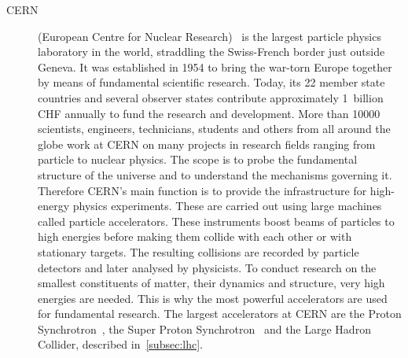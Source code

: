 \begin{description}
\item[CERN] (European Centre for Nuclear Research)~\cite{CERN:00000} is the largest particle physics laboratory in the world, straddling the Swiss-French border just outside Geneva. It was established in 1954 to bring the war-torn Europe together by means of fundamental scientific research. Today, its 22 member state countries and several observer states contribute approximately 1~billion CHF annually to fund the research and development. More than 10000 scientists, engineers, technicians, students and others from all around the globe work at CERN on many projects in research fields ranging from particle to nuclear physics. The scope is to probe the fundamental structure of the universe and to understand the mechanisms governing it. Therefore CERN's main function is to provide the infrastructure for high-energy physics experiments. These are carried out using large machines called particle accelerators. These instruments boost beams of particles to high energies before making them collide with each other or with stationary targets. The resulting collisions are recorded by particle detectors and later analysed by physicists. To conduct research on the smallest constituents of matter, their dynamics and structure, very high energies are needed. This is why the most powerful accelerators are used for fundamental research. The largest accelerators at CERN are the Proton Synchrotron~\cite{Regenstreif:342915}, the Super Proton Synchrotron~\cite{Mills:133232} and the Large Hadron Collider, described in~\ref{subsec:lhc}.




\end{description}
